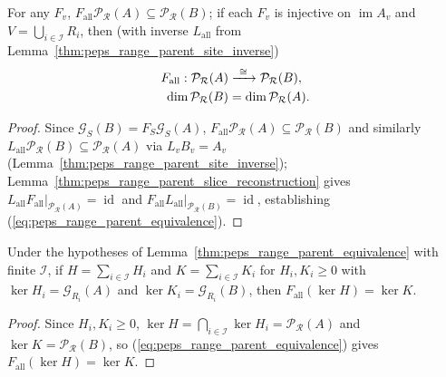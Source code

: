 \begin{lemma}%
    \label{thm:peps_range_parent_equivalence}
    \leanok
    For any $F_v$, $F_{\mathrm{all}}\mathcal P_{\mathcal R}(A)\subseteq\mathcal P_{\mathcal R}(B)$; if each $F_v$ is injective on $\operatorname{im}A_v$ and $V=\bigcup_{i\in\mathcal I}R_i$, then (with inverse $L_{\mathrm{all}}$ from Lemma~\ref{thm:peps_range_parent_site_inverse})
    \begin{align}
        F_{\mathrm{all}}:\mathcal P_{\mathcal R}(A)
                                       & \xrightarrow{\ \cong\ }\mathcal P_{\mathcal R}(B),
        \label{eq:peps_range_parent_equivalence}                                            \\
        \dim\mathcal P_{\mathcal R}(B) & =\dim\mathcal P_{\mathcal R}(A). \notag
    \end{align}
\end{lemma}
\begin{proof}\leanok
    Since $\mathcal G_S(B)=F_S\mathcal G_S(A)$, $F_{\mathrm{all}}\mathcal P_{\mathcal R}(A)\subseteq\mathcal P_{\mathcal R}(B)$ and similarly $L_{\mathrm{all}}\mathcal P_{\mathcal R}(B)\subseteq\mathcal P_{\mathcal R}(A)$ via $L_vB_v=A_v$ (Lemma~\ref{thm:peps_range_parent_site_inverse}); Lemma~\ref{thm:peps_range_parent_slice_reconstruction} gives $L_{\mathrm{all}}F_{\mathrm{all}}|_{\mathcal P_{\mathcal R}(A)}=\operatorname{id}$ and $F_{\mathrm{all}}L_{\mathrm{all}}|_{\mathcal P_{\mathcal R}(B)}=\operatorname{id}$, establishing (\ref{eq:peps_range_parent_equivalence}).
\end{proof}

\begin{lemma}%
    \label{thm:peps_range_parent_kernel}
    \leanok
    Under the hypotheses of Lemma~\ref{thm:peps_range_parent_equivalence} with finite $\mathcal I$, if $H=\sum_{i\in\mathcal I}H_i$ and $K=\sum_{i\in\mathcal I}K_i$ for $H_i,K_i\ge0$ with $\ker H_i=\mathcal G_{R_i}(A)$ and $\ker K_i=\mathcal G_{R_i}(B)$, then $F_{\mathrm{all}}(\ker H)=\ker K$.
\end{lemma}
\begin{proof}\leanok
    Since $H_i,K_i\ge0$, $\ker H=\bigcap_{i\in\mathcal I}\ker H_i=\mathcal P_{\mathcal R}(A)$ and $\ker K=\mathcal P_{\mathcal R}(B)$, so (\ref{eq:peps_range_parent_equivalence}) gives $F_{\mathrm{all}}(\ker H)=\ker K$.
\end{proof}

